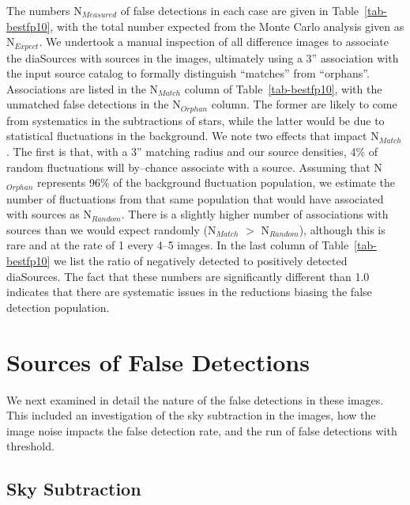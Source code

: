 \documentclass[iop]{emulateapj}
\begin{document}
The numbers N$_{Measured}$ of false detections in each case are given in Table~\ref{tab-bestfp10}, with the total number expected from the Monte Carlo analysis given as N$_{Expect}$.
We undertook a manual inspection of all difference images to associate the diaSources with sources in the images, ultimately using a 3'' association with the input source catalog to formally distinguish ``matches'' from ``orphans''.
Associations are listed in the N$_{Match}$ column of Table~\ref{tab-bestfp10}, with the unmatched false detections in the N$_{Orphan}$ column.
The former are likely to come from systematics in the subtractions of stars, while the latter would be due to statistical fluctuations in the background.
We note two effects that impact N$_{Match}$.
The first is that, with a 3'' matching radius and our source densities, 4\% of random fluctuations will by--chance associate with a source.
Assuming that N$_{Orphan}$ represents 96\% of the background fluctuation population, we estimate the number of fluctuations from that same population that would have associated with sources as N$_{Random}$.
There is a slightly higher number of associations with sources than we would expect randomly (N$_{Match}$ $>$ N$_{Random}$), although this is rare and at the rate of 1 every 4--5 images.
In the last column of Table~\ref{tab-bestfp10} we list the ratio of negatively detected to positively detected diaSources.
The fact that these numbers are significantly different than 1.0 indicates that there are systematic issues in the reductions biasing the false detection population.

\section{Sources of False Detections}
We next examined in detail the nature of the false detections in these images.
This included an investigation of the sky subtraction in the images, how the image noise impacts the false detection rate, and the run of false detections with threshold.

\subsection{Sky Subtraction}
\end{document}
